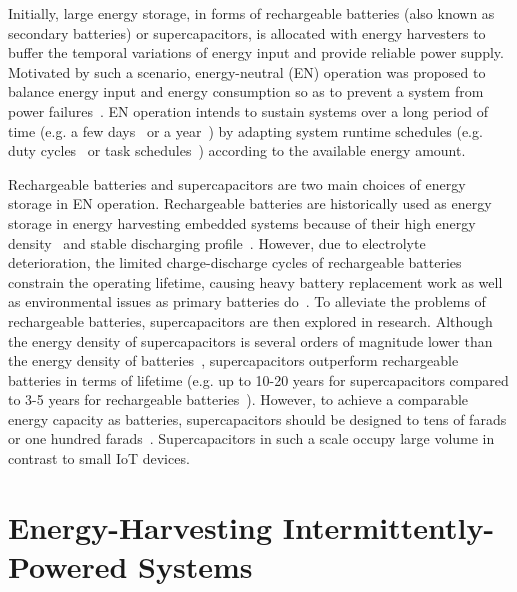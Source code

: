 Initially, large energy storage, in forms of rechargeable batteries (also known as secondary batteries) or supercapacitors, is allocated with energy harvesters to buffer the temporal variations of energy input and provide reliable power supply. 
Motivated by such a scenario, energy-neutral (EN) operation was proposed to balance energy input and energy consumption so as to prevent a system from power failures~\cite{sudevalayam2011energy}. 
EN operation intends to sustain systems over a long period of time (e.g. a few days~\cite{kansal2007power} or a year~\cite{buchli2014dynamic}) by adapting system runtime schedules (e.g. duty cycles~\cite{kansal2007power, buchli2014dynamic, le2012power} or task schedules~\cite{caruso2018dynamic, wagemann2018operating}) according to the available energy amount. 

Rechargeable batteries and supercapacitors are two main choices of energy storage in EN operation. 
Rechargeable batteries are historically used as energy storage in energy harvesting embedded systems because of their high energy density~\cite{akhtar2015energy} and stable discharging profile~\cite{sudevalayam2011energy}. 
However, due to electrolyte deterioration, the limited charge-discharge cycles of rechargeable batteries constrain the operating lifetime, causing heavy battery replacement work as well as environmental issues as primary batteries do~\cite{rakhmatov2002battery}. 
To alleviate the problems of rechargeable batteries, supercapacitors are then explored in research. 
Although the energy density of supercapacitors is several orders of magnitude lower than the energy density of batteries~\cite{merrett2012supercapacitor}, supercapacitors outperform rechargeable batteries in terms of lifetime (e.g. up to 10-20 years for supercapacitors compared to 3-5 years for rechargeable batteries~\cite{simjee2008efficient}). 
However, to achieve a comparable energy capacity as batteries, supercapacitors should be designed to tens of farads or one hundred farads~\cite{jiang2005perpetual, simjee2006everlast}. 
Supercapacitors in such a scale occupy large volume in contrast to small IoT devices. 

\section{Energy-Harvesting Intermittently-Powered Systems}

